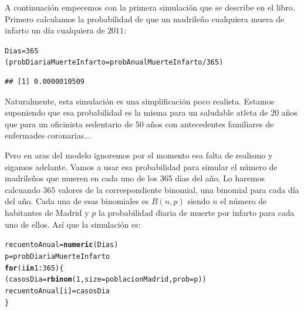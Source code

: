 \documentclass[10pt,a4paper]{article}\usepackage[]{graphicx}\usepackage[]{color}
\makeatletter
\newcommand{\hlnum}[1]{\textcolor[rgb]{0.686,0.059,0.569}{#1}}%
\newcommand{\hlopt}[1]{\textcolor[rgb]{0,0,0}{#1}}%
\newcommand{\hlstd}[1]{\textcolor[rgb]{0.345,0.345,0.345}{#1}}%
\newcommand{\hlkwa}[1]{\textcolor[rgb]{0.161,0.373,0.58}{\textbf{#1}}}%
\newcommand{\hlkwb}[1]{\textcolor[rgb]{0.69,0.353,0.396}{#1}}%
\newcommand{\hlkwc}[1]{\textcolor[rgb]{0.333,0.667,0.333}{#1}}%
\newcommand{\hlkwd}[1]{\textcolor[rgb]{0.737,0.353,0.396}{\textbf{#1}}}%
\newenvironment{kframe}{%
 \def\at@end@of@kframe{}%
 \ifinner\ifhmode%
  \def\at@end@of@kframe{\end{minipage}}%
  \begin{minipage}{\columnwidth}%
 \fi\fi%
 \def\FrameCommand##1{\hskip\@totalleftmargin \hskip-\fboxsep
 \colorbox{shadecolor}{##1}\hskip-\fboxsep
     \hskip-\linewidth \hskip-\@totalleftmargin \hskip\columnwidth}%
 \MakeFramed {\advance\hsize-\width
   \@totalleftmargin\z@ \linewidth\hsize
   \@setminipage}}%
 {\par\unskip\endMakeFramed%
 \at@end@of@kframe}
\newenvironment{knitrout}{}{} %
\newcounter {cont01}
\makeatother
\begin{document}
A continuación empecemos con la primera simulación que se describe en el libro. Primero calculamos la probabilidad de que un madrileño cualquiera muera de infarto un día cualquiera de $2011$:

\begin{knitrout}
\color{fgcolor}\begin{kframe}
\begin{alltt}
\hlstd{Dias} \hlkwb{=} \hlnum{365}
\hlstd{(probDiariaMuerteInfarto} \hlkwb{=} \hlstd{probAnualMuerteInfarto}\hlopt{/}\hlnum{365}\hlstd{)}
\end{alltt}
\begin{verbatim}
## [1] 0.0000010509
\end{verbatim}
\end{kframe}
\end{knitrout}
Naturalmente,  esta simulación es una simplificación poco realista.  Estamos suponiendo que esa probabilidad es la misma para un saludable atleta de $20$ años que para un oficinista sedentario de $50$ años con antecedentes familiares de enfermades coronarias...

Pero en aras del modelo ignoremos por el momento esa falta de realismo y sigamos adelante. Vamos a usar esa probabilidad  para simular el número de madrileños que mueren en cada uno de los 365 días del año. Lo haremos calcuando $365$ valores de la correspondiente binomial, una binomial para cada día del año. Cada una de esas binomiales es $B(n, p)$ siendo $n$ el número de habitantes de Madrid y $p$ la probabilidad diaria de muerte por infarto para cada uno de ellos. Así que la simulación es:

\begin{knitrout}
\color{fgcolor}\begin{kframe}
\begin{alltt}
\hlstd{recuentoAnual} \hlkwb{=} \hlkwd{numeric}\hlstd{(Dias)}
\hlstd{p} \hlkwb{=} \hlstd{probDiariaMuerteInfarto}
\hlkwa{for}\hlstd{(i} \hlkwa{in} \hlnum{1}\hlopt{:}\hlnum{365}\hlstd{)\{}
  \hlstd{(casosDia} \hlkwb{=} \hlkwd{rbinom}\hlstd{(}\hlnum{1}\hlstd{,} \hlkwc{size}\hlstd{=poblacionMadrid,} \hlkwc{prob}\hlstd{=p))}
  \hlstd{recuentoAnual[i]} \hlkwb{=} \hlstd{casosDia}
\hlstd{\}}
\end{alltt}
\end{kframe}
\end{knitrout}
\end{document}
